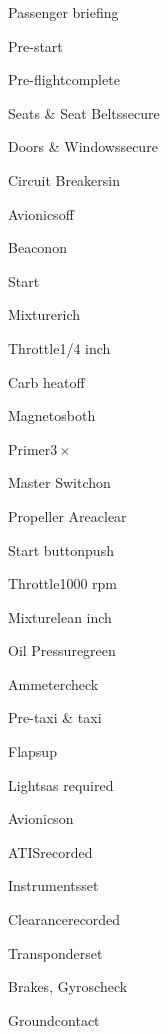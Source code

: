 





\begin{multicols}{2}
\begin{checklist}{Passenger briefing}
\end{checklist}

\begin{checklist}{Pre-start}
    \item{Pre-flight}{complete}
    \item{Seats \& Seat Belts}{secure}
    \item{Doors \& Windows}{secure}
    \item{Circuit Breakers}{in}
    \item{Avionics}{off}
    \item{Beacon}{on}
\end{checklist}

\begin{checklist}{Start}
    \item{Mixture}{rich}
    \item{Throttle}{1/4 inch}
    \item{Carb heat}{off}
    \item{Magnetos}{both}
    \item{Primer}{$3\times$}
    \item{Master Switch}{on}
    \item{Propeller Area}{clear}
    \item{Start button}{push}
    \item{Throttle}{1000 rpm}
    \item{Mixture}{lean  inch}
    \item{Oil Pressure}{green}
    \item{Ammeter}{check}
\end{checklist}

\begin{checklist}{Pre-taxi \& taxi}
    \item{Flaps}{up}
    \item{Lights}{as required}
    \item{Avionics}{on}
    \item{ATIS}{recorded}
    \item{Instruments}{set}
    \item{Clearance}{recorded}
    \item{Transponder}{set}
    \item{Brakes, Gyros}{check}
    \item{Ground}{contact}
\end{checklist}


\end{multicols}
